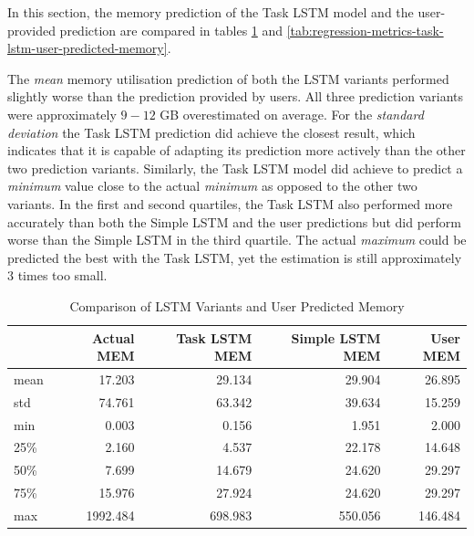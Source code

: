       In this section, the memory prediction of the Task LSTM model and the user-provided prediction are compared in tables \ref{tab:comparison-task-lstm-user-predicted-memory} and \ref{tab:regression-metrics-task-lstm-user-predicted-memory}.

      The \emph{mean} memory utilisation prediction of both the LSTM variants performed slightly worse than the prediction provided by users.
      All three prediction variants were approximately $9-12$ GB overestimated on average.
      For the \emph{standard deviation} the Task LSTM prediction did achieve the closest result, which indicates that it is capable of adapting its prediction more actively than the other two prediction variants.
      Similarly, the Task LSTM model did achieve to predict a \emph{minimum} value close to the actual \emph{minimum} as opposed to the other two variants.
      In the first and second quartiles, the Task LSTM also performed more accurately than both the Simple LSTM and the user predictions but did perform worse than the Simple LSTM in the third quartile.
      The actual \emph{maximum} could be predicted the best with the Task LSTM, yet the estimation is still approximately $3$ times too small.
      \begin{table}
        \centering
        \caption{Comparison of LSTM Variants and User Predicted Memory}
        \label{tab:comparison-task-lstm-user-predicted-memory}

        \begin{tabular}{|l|rrrr|}
          \toprule
          {} &  Actual MEM &  Task LSTM MEM &  Simple LSTM MEM &  User MEM \\
          \midrule
          mean &         17.203 &            29.134 &              29.904 &       26.895 \\
          std  &         74.761 &            63.342 &              39.634 &       15.259 \\
          min  &          0.003 &             0.156 &               1.951 &        2.000 \\
          25\%  &          2.160 &             4.537 &              22.178 &       14.648 \\
          50\%  &          7.699 &            14.679 &              24.620 &       29.297 \\
          75\%  &         15.976 &            27.924 &              24.620 &       29.297 \\
          max  &       1992.484 &           698.983 &             550.056 &      146.484 \\
          \bottomrule
          \end{tabular}
      \end{table}

